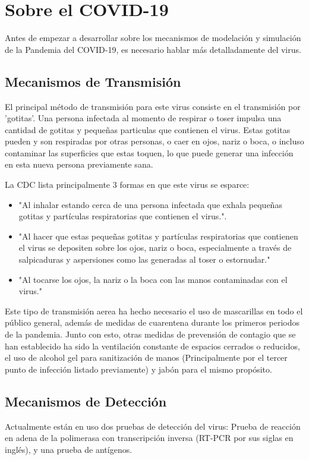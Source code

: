 \section{Sobre el COVID-19}
Antes de empezar a desarrollar sobre los mecanismos de modelación y simulación de la Pandemia del COVID-19, es necesario hablar más detalladamente del virus.

\subsection*{Mecanismos de Transmisión}
El principal método de transmisión para este virus consiste en el transmisión por 'gotitas'. Una persona infectada al momento de respirar o toser impulsa una cantidad de gotitas y pequeñas particulas que contienen el virus. Estas gotitas pueden y son respiradas por otras personas, o caer en ojos, nariz o boca, o incluso contaminar las superficies que estas toquen, lo que puede generar una infección en esta nueva persona previamente sana. \cite{cdc_2021}

La CDC lista principalmente 3 formas en que este virus se esparce:

\begin{itemize}
    \item "Al inhalar estando cerca de una persona infectada que exhala pequeñas gotitas y partículas respiratorias que contienen el virus.".
    \item "Al hacer que estas pequeñas gotitas y partículas respiratorias que contienen el virus se depositen sobre los ojos, nariz o boca, especialmente a través de salpicaduras y aspersiones como las generadas al toser o estornudar."
    \item "Al tocarse los ojos, la nariz o la boca con las manos contaminadas con el virus."
\end{itemize}

Este tipo de transmisión aerea ha hecho necesario el uso de mascarillas en todo el público general, además de medidas de cuarentena durante los primeros periodos de la pandemia. Junto con esto, otras medidas de prevensión de contagio que se han establecido ha sido la ventilación constante de espacios cerrados o reducidos, el uso de alcohol gel para sanitización de manos (Principalmente por el tercer punto de infección listado previamente) y jabón para el mismo propósito. 

\subsection*{Mecanismos de Detección}
Actualmente están en uso dos pruebas de detección del virus: Prueba de reacción en adena de la polimerasa con transcripción inversa (RT-PCR por sus siglas en inglés), y una prueba de antígenos.

